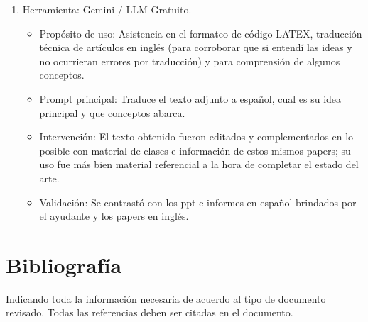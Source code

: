 \documentclass[letter, 10pt]{article}
\begin{document}
\begin{enumerate}
\item Herramienta: Gemini / LLM Gratuito.
\begin{itemize}
\item Prop\'osito de uso:  Asistencia en el formateo de código LATEX, traducción técnica de artículos en
inglés (para corroborar que si entendí las ideas y no ocurrieran errores por traducción) y para comprensión de algunos conceptos.
\item Prompt principal: 
    Traduce el texto adjunto a español, cual es su idea principal y que conceptos abarca.
\item Intervención: El texto obtenido fueron editados y complementados en lo posible con material de clases e información de estos mismos papers; su uso fue más bien material referencial a la hora de completar el estado del arte.
\item Validación: Se contrastó con los ppt e informes en español brindados por el ayudante y los papers en inglés.

\end{itemize}
\end{enumerate}




\section{Bibliograf\'ia}
Indicando toda la informaci\'on necesaria de acuerdo al tipo de documento revisado. Todas las referencias deben ser citadas en el documento.


\end{document}
